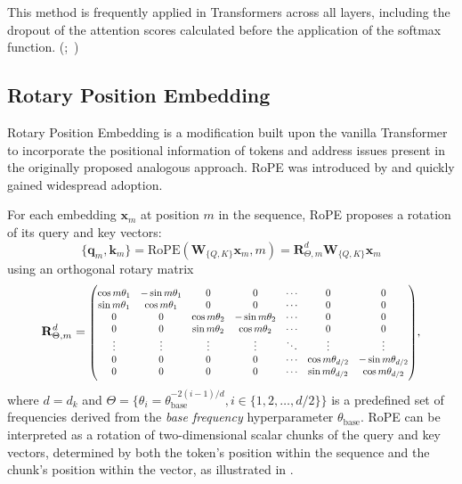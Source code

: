 This method is frequently applied in Transformers across all layers, including the dropout of the attention scores calculated before the application of the softmax function. (\cite{vaswani2017};~\cite{zehui2019})

\subsection{Rotary Position Embedding}\label{sec:rotary-position-embedding}

Rotary Position Embedding is a modification built upon the vanilla Transformer to incorporate the positional information of tokens and address issues present in the originally proposed analogous approach. RoPE was introduced by \citet{su2021} and quickly gained widespread adoption.

For each embedding \(\mathbf{x}_m\) at position \(m\) in the sequence, RoPE proposes a rotation of its query and key vectors:
\begin{equation}
	\{\mathbf{q}_m, \mathbf{k}_m\} = \mathrm{RoPE}(\mathbf{W}_{\{Q, K\}}\mathbf{x}_m, m) = \mathbf{R}^d_{\Theta, m}\mathbf{W}_{\{Q, K\}}\mathbf{x}_m 
\end{equation}
using an orthogonal rotary matrix  
\begin{equation}    
	\mathbf{R}^d_{\Theta,m} = 
	\scalebox{0.8}{\(
	\begin{pmatrix}
		\cos{m\theta_1}& -\sin{m\theta_1}&0&0&\cdots&0&0\\
		\sin{m\theta_1}&\cos{m\theta_1}&0&0&\cdots&0&0 \\
		0&0&\cos{m\theta_2}& -\sin{m\theta_2}&\cdots&0&0\\
		0&0&\sin{m\theta_2}&\cos{m\theta_2}&\cdots&0&0 \\
		\vdots&\vdots&\vdots&\vdots&\ddots&\vdots&\vdots\\
		0&0&0&0&\cdots&\cos{m\theta_{d/2}}& -\sin{m\theta_{d/2}}\\
		0&0&0&0&\cdots&\sin{m\theta_{d/2}}&\cos{m\theta_{d/2}}
	\end{pmatrix}
	\)},
\end{equation}
where \(d = d_k\) and \(\Theta = \{\theta_i=\theta_{\mathrm{base}}^{-2(i-1)/d}, i \in \{1, 2, \ldots, d/2\}\}\) is a predefined set of frequencies derived from the \textit{base frequency} hyperparameter \(\theta_{\mathrm{base}}\). RoPE can be interpreted as a rotation of two-dimensional scalar chunks of the query and key vectors, determined by both the token's position within the sequence and the chunk's position within the vector, as illustrated in .

